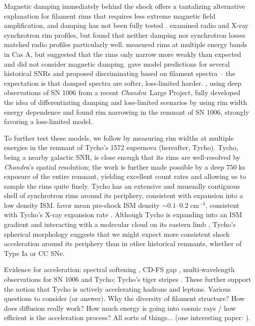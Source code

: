 \documentclass[iop, apj, numberedappendix, twocolappendix]{emulateapj}
\newcommand*{\mt}{\mathrm}
\newcommand*{\unit}[1]{\;\mt{#1}}  %
\newcommand*{\abt}{\mathord{\sim}} %
\newcommand*{\Chandra}{\textit{Chandra}\ }
\begin{document}
Magnetic damping immediately behind the shock offers a tantalizing alternative
explanation for filament rims that requires less extreme magnetic field
amplification, and damping has not been fully tested \citep{pohl2005,
marcowith2010}.  \citet{cassam-chenai2007} examined radio and X-ray synchrotron
rim profiles, but found that neither damping nor synchrotron losses matched
radio profiles particularly well.  \citet{araya2010} measured rims at multiple
energy bands in Cas A, but suggested that the rims only narrow more weakly than
expected and did not consider magnetic damping.  \citet{rettig2012} gave model
predictions for several historical SNRs and proposed discriminating based on
filament spectra -- the expectation is that damped spectra are softer,
loss-limited harder.  \citet{ressler2014}, using deep observations of SN 1006
from a recent \Chandra Large Project, fully developed the idea of
differentiating damping and loss-limited scenarios by using rim width energy
dependence and found rim narrowing in the remnant of SN 1006, strongly favoring
a loss-limited model.

To further test these models, we follow \citet{ressler2014} by measuring rim
widths at multiple energies in the remnant of Tycho's 1572 supernova
(hereafter, Tycho).  Tycho, being a nearby galactic SNR, is close enough that
its rims are well-resolved by \textit{Chandra}'s spatial resolution; the work
is further made possible by a deep $750 \unit{ks}$ exposure of the entire
remnant, yielding excellent count rates and allowing us to sample the rims
quite finely.  Tycho has an extensive and unusually contiguous shell of
synchrotron rims around its periphery, consistent with expansion into a low
density ISM.  \citet{williams2013} favor mean pre-shock ISM density $\abt
0.1$--$0.2 \unit{cm^{-3}}$, consistent with Tycho's X-ray expansion rate
\citep{katsuda2010}.  Although Tycho is expanding into an ISM gradient
\citep{williams2013} and interacting with a molecular cloud on its eastern limb
\citep{reynoso1999}, Tycho's spherical morphology suggests that we might expect
more consistent shock acceleration around its periphery than in other
historical remnants, whether of Type Ia or CC SNe.

Evidence for acceleration: spectral softening \citep{cassam-chenai2007}, CD-FS
gap \citep{warren2005}, multi-wavelength observations \citep{acero2010,
acciari2011, morlino2012} for SN 1006 and Tycho; Tycho's tiger stripes
\citep{eriksen2011}. These further support the notion that Tycho is actively
accelerating hadrons and leptons.
Various questions to consider (or answer).
Why the diversity of filament structure? How does diffusion really work?  How
much energy is going into cosmic rays / how efficient is the acceleration
process?  All sorts of things... (one interesting paper: \citet{caprioli2013}).
\end{document}
